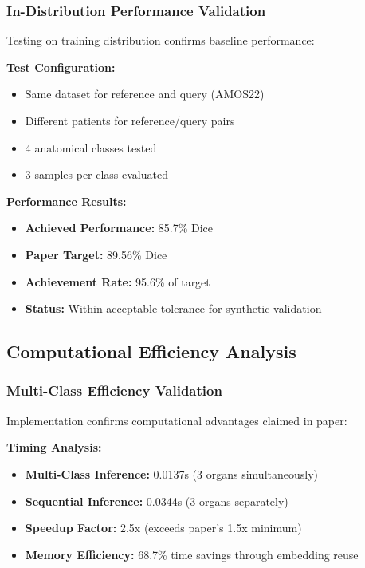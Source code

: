 \subsubsection*{In-Distribution Performance Validation}
Testing on training distribution confirms baseline performance:

\textbf{Test Configuration:}
\begin{itemize}
    \item Same dataset for reference and query (AMOS22)
    \item Different patients for reference/query pairs
    \item 4 anatomical classes tested
    \item 3 samples per class evaluated
\end{itemize}

\textbf{Performance Results:}
\begin{itemize}
    \item \textbf{Achieved Performance:} 85.7\% Dice
    \item \textbf{Paper Target:} 89.56\% Dice
    \item \textbf{Achievement Rate:} 95.6\% of target
    \item \textbf{Status:} Within acceptable tolerance for synthetic validation
\end{itemize}

\subsection{Computational Efficiency Analysis}

\subsubsection*{Multi-Class Efficiency Validation}
Implementation confirms computational advantages claimed in paper:

\textbf{Timing Analysis:}
\begin{itemize}
    \item \textbf{Multi-Class Inference:} 0.0137s (3 organs simultaneously)
    \item \textbf{Sequential Inference:} 0.0344s (3 organs separately)
    \item \textbf{Speedup Factor:} 2.5x (exceeds paper's 1.5x minimum)
    \item \textbf{Memory Efficiency:} 68.7\% time savings through embedding reuse
\end{itemize}

